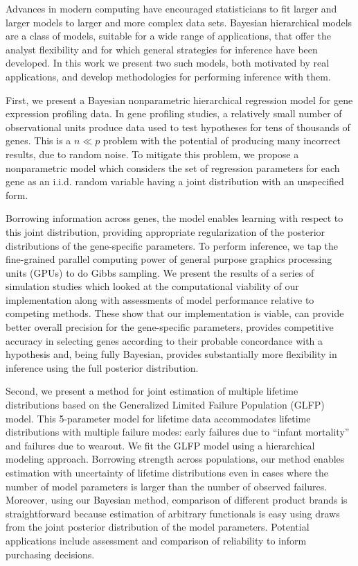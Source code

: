 Advances in modern computing have encouraged statisticians to fit larger and larger models to larger and more complex data sets. Bayesian hierarchical models are a class of models, suitable for a wide range of applications, that offer the analyst flexibility and for which general strategies for inference have been developed. In this work we present two such models, both motivated by real applications, and develop methodologies for performing inference with them.

First, we present a Bayesian nonparametric hierarchical regression model for gene expression profiling data. In gene profiling studies, a relatively small number of observational units produce data used to test hypotheses for tens of thousands of genes. This is a $n \ll p$ problem with the potential of producing many incorrect results, due to random noise. To mitigate this problem, we propose a nonparametric model which considers the set of regression parameters for each gene as an i.i.d. random variable having a joint distribution with an unspecified form.

Borrowing information across genes, the model enables learning with respect to this joint distribution, providing appropriate regularization of the posterior distributions of the gene-specific parameters. To perform inference, we tap the fine-grained parallel computing power of general purpose graphics processing units (GPUs) to do Gibbs sampling. We present the results of a series of simulation studies which looked at the computational viability of our implementation along with assessments of model performance relative to competing methods. These show that our implementation is viable, can provide better overall precision for the gene-specific parameters, provides competitive accuracy in selecting genes according to their probable concordance with a hypothesis and, being fully Bayesian, provides substantially more flexibility in inference using the full posterior distribution.

Second, we present a method for joint estimation of multiple lifetime distributions based on the Generalized Limited Failure Population (GLFP) model. This 5-parameter model for lifetime data accommodates lifetime distributions with multiple failure modes:  early failures due to ``infant mortality'' and failures due to wearout. We fit the GLFP model using a hierarchical modeling approach.  Borrowing strength across populations, our method enables estimation with uncertainty of lifetime distributions even in cases where the number of model parameters is larger than the number of observed failures.  Moreover, using our Bayesian method, comparison of different product brands is straightforward because estimation of arbitrary functionals is easy using draws from the joint posterior distribution of the model parameters. Potential applications include assessment and comparison of reliability to inform purchasing decisions.